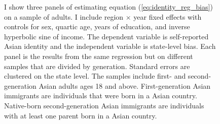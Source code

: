 \begin{center}
\begin{figure}[!htb]
\caption*{\footnotesize{I show three panels of estimating equation (\ref{eq:identity_reg_bias}) on a sample of adults. I include region $\times$ year fixed effects with controls for sex, quartic age, years of education, and inverse hyperbolic sine of income. The dependent variable is self-reported Asian identity and the independent variable is state-level bias. Each panel is the results from the same regression but on different samples that are divided by generation. Standard errors are clustered on the state level. The samples include first- and second-generation Asian adults ages 18 and above. First-generation Asian immigrants are individuals that were born in a Asian country. Native-born second-generation Asian immigrants are individuals with at least one parent born in a Asian country.}}
\end{figure}
\end{center}

\pagebreak
\newpage

